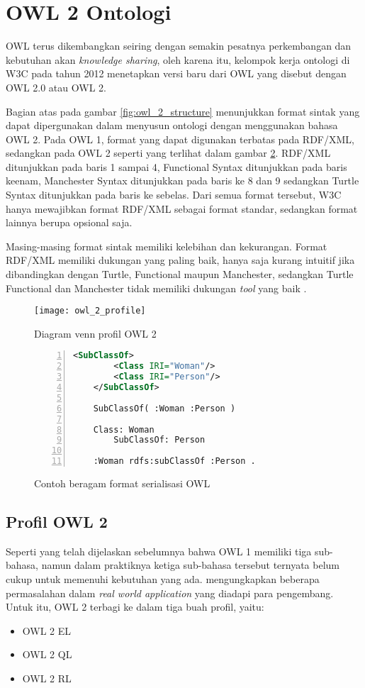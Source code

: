 \section{OWL 2 Ontologi}
OWL terus dikembangkan seiring dengan semakin pesatnya perkembangan dan kebutuhan akan \emph{knowledge sharing}, oleh karena itu, kelompok kerja ontologi di W3C pada tahun 2012 menetapkan versi baru dari OWL yang disebut dengan OWL 2.0 atau OWL 2.

Bagian atas pada gambar \ref{fig:owl_2_structure} menunjukkan format sintak yang dapat dipergunakan dalam menyusun ontologi dengan menggunakan bahasa OWL 2. Pada OWL 1, format yang dapat digunakan terbatas pada RDF/XML, sedangkan pada OWL 2 seperti yang terlihat dalam gambar \ref{fig:owl_serialization_formats}. RDF/XML ditunjukkan pada baris 1 sampai 4, Functional Syntax ditunjukkan pada baris keenam, Manchester Syntax ditunjukkan pada baris ke 8 dan 9 sedangkan Turtle Syntax ditunjukkan pada baris ke sebelas. Dari semua format tersebut, W3C hanya mewajibkan format RDF/XML sebagai format standar, sedangkan format lainnya berupa opsional saja.

Masing-masing format sintak memiliki kelebihan dan kekurangan. Format RDF/XML memiliki dukungan yang paling baik, hanya saja kurang intuitif jika dibandingkan dengan Turtle, Functional maupun Manchester, sedangkan Turtle Functional dan Manchester tidak memiliki dukungan \emph{tool} yang baik \citep{liyang_yu}.

\begin{figure}[ht]
	\centering
	\texttt{[image: owl\_2\_profile]}
	\caption{Diagram venn profil OWL 2}
	\label{fig:owl_2_profile}
\end{figure}

\begin{figure}[ht]
	\centering
	\begin{lstlisting}[language=XML, numbers=left]
	<SubClassOf>
		<Class IRI="Woman"/>
		<Class IRI="Person"/>
	</SubClassOf>

	SubClassOf( :Woman :Person )

	Class: Woman
		SubClassOf: Person

	:Woman rdfs:subClassOf :Person .\end{lstlisting}
	\caption{Contoh beragam format serialisasi OWL}
	\label{fig:owl_serialization_formats}
\end{figure}

\subsection{Profil OWL 2}
Seperti yang telah dijelaskan sebelumnya bahwa OWL 1 memiliki tiga sub-bahasa, namun dalam praktiknya ketiga sub-bahasa tersebut ternyata belum cukup untuk memenuhi kebutuhan yang ada. \citet{patel} mengungkapkan beberapa permasalahan dalam \emph{real world application} yang diadapi para pengembang. Untuk itu, OWL 2 terbagi ke dalam tiga buah profil, yaitu:
\begin{itemize}
	\item OWL 2 EL
	\item OWL 2 QL
	\item OWL 2 RL
\end{itemize}

